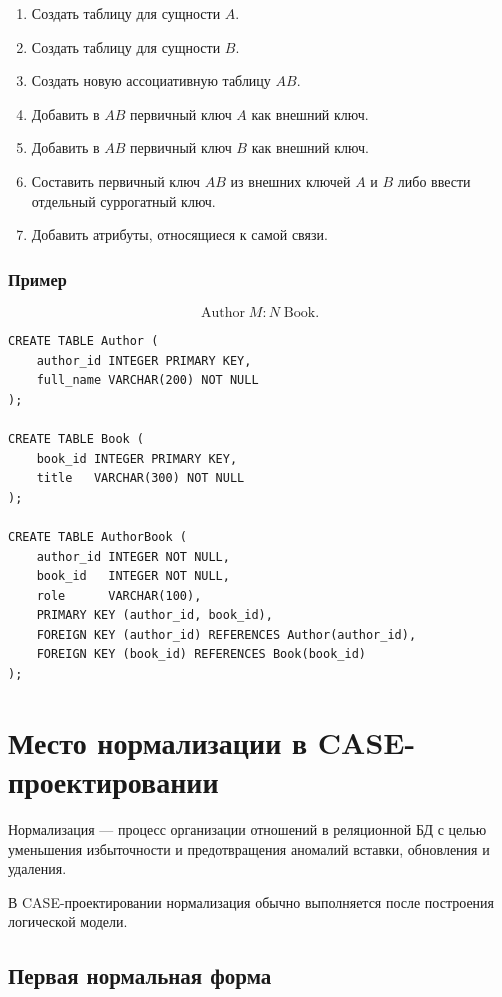 \documentclass[12pt,a4paper]{article}
\theoremstyle{remark}
\begin{document}
\begin{enumerate}
    \item Создать таблицу для сущности $A$.
    \item Создать таблицу для сущности $B$.
    \item Создать новую ассоциативную таблицу $AB$.
    \item Добавить в $AB$ первичный ключ $A$ как внешний ключ.
    \item Добавить в $AB$ первичный ключ $B$ как внешний ключ.
    \item Составить первичный ключ $AB$ из внешних ключей $A$ и $B$ либо ввести отдельный суррогатный ключ.
    \item Добавить атрибуты, относящиеся к самой связи.
\end{enumerate}

\subsubsection*{Пример}

\[
    \text{Author} \; M : N \; \text{Book}.
\]

\begin{verbatim}
CREATE TABLE Author (
    author_id INTEGER PRIMARY KEY,
    full_name VARCHAR(200) NOT NULL
);

CREATE TABLE Book (
    book_id INTEGER PRIMARY KEY,
    title   VARCHAR(300) NOT NULL
);

CREATE TABLE AuthorBook (
    author_id INTEGER NOT NULL,
    book_id   INTEGER NOT NULL,
    role      VARCHAR(100),
    PRIMARY KEY (author_id, book_id),
    FOREIGN KEY (author_id) REFERENCES Author(author_id),
    FOREIGN KEY (book_id) REFERENCES Book(book_id)
);
\end{verbatim}

\section{Место нормализации в CASE-проектировании}

Нормализация --- процесс организации отношений в реляционной БД с целью уменьшения избыточности и предотвращения аномалий вставки, обновления и удаления.

В CASE-проектировании нормализация обычно выполняется после построения логической модели.

\subsection{Первая нормальная форма}
\end{document}
